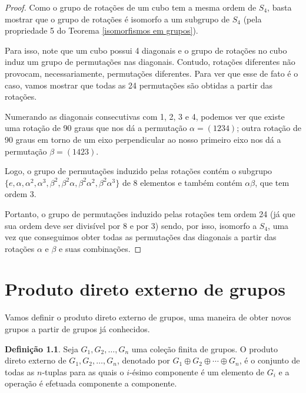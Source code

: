 \documentclass[a4paper,portuguese,11pt,twoside, leqno]{book}
\theoremstyle{definition}
\newtheorem{deff}{Definição}[section]
\begin{document}
	\begin{proof}
		Como o grupo de rotações de um cubo tem a mesma ordem de $S_4$, basta mostrar que o grupo de rotações é isomorfo a um subgrupo de $S_4$ (pela propriedade 5 do Teorema \eqref{isomorfismos em grupos}). 
		\par\vspace{0.3cm} Para isso, note que um cubo possui 4 diagonais e o grupo de rotações no cubo induz um grupo de permutações nas diagonais. Contudo, rotações diferentes não provocam, necessariamente, permutações diferentes. Para ver que esse de fato é o caso, vamos mostrar que todas as 24 permutações são obtidas a partir das rotações.
		\par\vspace{0.3cm} Numerando as diagonais consecutivas com 1, 2, 3 e 4, podemos ver que existe uma rotação de 90 graus que nos dá a permutação $\alpha = (1234)$; outra rotação de 90 graus em torno de um eixo perpendicular ao nosso primeiro eixo nos dá a permutação $\beta = (1423)$.
		\par\vspace{0.3cm} Logo, o grupo de permutações induzido pelas rotações contém o subgrupo \\$\{e, \alpha, \alpha^2, \alpha^3, \beta^2, \beta^2\alpha, \beta^2\alpha^2, \beta^2\alpha^3\}$ de 8 elementos e também contém $\alpha\beta$, que tem ordem 3. 
		\par\vspace{0.3cm} Portanto, o grupo de permutações induzido pelas rotações tem ordem 24 (já que sua ordem deve ser divisível por 8 e por 3) sendo, por isso, isomorfo a $S_4$, uma vez que conseguimos obter todas as permutações das diagonais a partir das rotações $\alpha$ e $\beta$ e suas combinações. 
		
	\end{proof}
	
	
	\chapter{Produto direto externo de grupos}\label{capitulo prod dir ext}
	\hspace{12pt} Vamos definir o produto direto externo de grupos, uma maneira de obter novos grupos a partir de grupos já conhecidos.
	\begin{deff}
		\label{def prod direto externo}
		Seja $G_1, G_2, \dots, G_n$ uma coleção finita de grupos. O produto direto externo de $G_1, G_2, \dots, G_n$, denotado por $\displaystyle{G_1\oplus G_2\oplus\cdots\oplus G_n}$, é o conjunto de todas as $n$-tuplas para as quais o $i$-ésimo componente é um elemento de $G_i$ e a operação é efetuada componente a componente.
	\end{deff}
	
\end{document}
